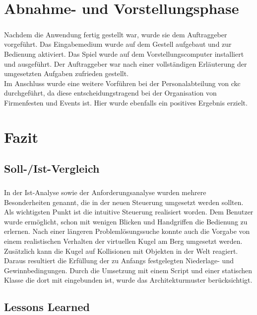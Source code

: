 \chapter{Abnahme- und Vorstellungsphase}
\paragraph{}
Nachdem die Anwendung fertig gestellt war, wurde sie dem Auftraggeber vorgeführt. Das Eingabemedium wurde auf dem Gestell aufgebaut und zur Bedienung aktiviert. Das Spiel wurde auf dem Vorstellungscomputer installiert und ausgeführt. Der Auftraggeber war nach einer vollständigen Erläuterung der umgesetzten Aufgaben zufrieden gestellt.
\\
Im Anschluss wurde eine weitere Vorführen bei der Personalabteilung von ckc durchgeführt, da diese entscheidungstragend bei der Organisation von Firmenfesten und Events ist. Hier wurde ebenfalls ein positives Ergebnis erzielt.

\begingroup
\renewcommand{\cleardoublepage}{}
\renewcommand{\clearpage}{}

\chapter{Fazit}
\section{Soll-/Ist-Vergleich}
\paragraph{}
In der Ist-Analyse sowie der Anforderungsanalyse wurden mehrere Besonderheiten genannt, die in der neuen Steuerung umgesetzt werden sollten. Als wichtigsten Punkt ist die intuitive Steuerung realisiert worden. Dem Benutzer wurde ermöglicht, schon mit wenigen Blicken und Handgriffen die Bedienung zu erlernen. Nach einer längeren Problemlösungssuche konnte auch die Vorgabe von einem realistischen Verhalten der virtuellen Kugel am Berg umgesetzt werden. Zusätzlich kann die Kugel auf Kollisionen mit Objekten in der Welt reagiert. Daraus resultiert die Erfüllung der zu Anfangs festgelegten Niederlage- und Gewinnbedingungen. Durch die Umsetzung mit einem Script und einer statischen Klasse die dort mit eingebunden ist, wurde das Architekturmuster berücksichtigt.

\section{Lessons Learned}
